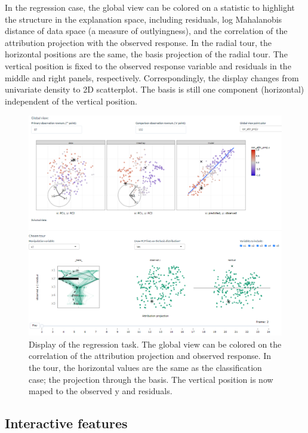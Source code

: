 \documentclass[
  article]{article}
\begin{document}
In the regression case, the global view can be colored on a statistic to highlight the structure in the explanation space, including residuals, log Mahalanobis distance of data space (a measure of outlyingness), and the correlation of the attribution projection with the observed response. In the radial tour, the horizontal positions are the same, the basis projection of the radial tour. The vertical position is fixed to the observed response variable and residuals in the middle and right panels, respectively. Correspondingly, the display changes from univariate density to 2D scatterplot. The basis is still one component (horizontal) independent of the vertical position.

\begin{figure}

{\centering \includegraphics[width=1\linewidth]{./figures/app_regression} 

}

\caption{Display of the regression task. The global view can be colored on the correlation of the attribution projection and observed response. In the tour, the horizontal values are the same as the classification case; the projection through the basis. The vertical position is now maped to the observed y and residuals.}\label{fig:regressioncase}
\end{figure}

\hypertarget{interactive-features}{%
\subsection{Interactive features}\label{interactive-features}}
\end{document}
